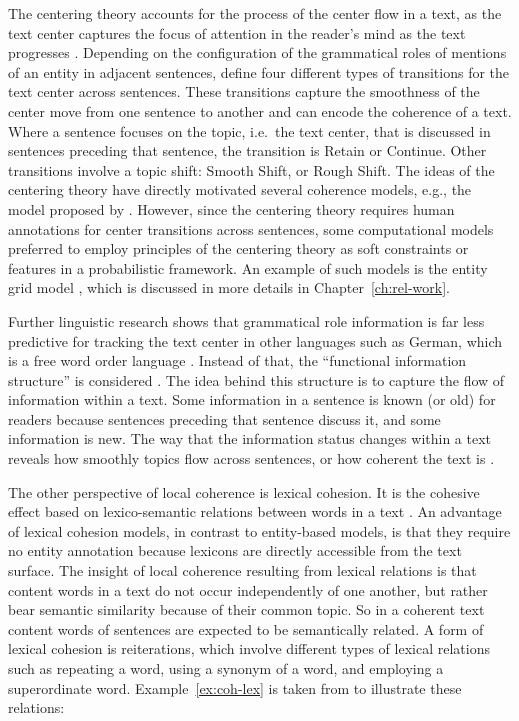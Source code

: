 The centering theory accounts for the process of the center flow in a text, as the text center captures the focus of attention in the reader's mind as the text progresses \cite{grosz95}. 
Depending on the configuration of the grammatical roles of mentions of an entity in adjacent sentences,  define four different types of transitions for the text center across sentences. 
These transitions capture the smoothness of the center move from one sentence to another and can encode the coherence of a text.   
Where a sentence focuses on the topic, i.e.\ the text center, that is discussed in sentences preceding that sentence, the transition is Retain or Continue. 
Other transitions involve a topic shift: Smooth Shift, or Rough Shift. 
The ideas of the centering theory have directly motivated several coherence models, e.g., the model proposed by .  
However, since the centering theory requires human annotations for center transitions across sentences, some computational models preferred to employ principles of the centering theory as soft constraints or features in a probabilistic framework. An example of such models is the entity grid model \cite{barzilay05a,barzilay08}, which is discussed in more details in Chapter~\ref{ch:rel-work}. 

Further linguistic research shows that grammatical role information is far less predictive for tracking the text center in other languages such as German, which is a free word order language \cite{strube.acl96}. 
Instead of that, the ``functional information structure'' \cite{danes74a} is considered \cite{strube.acl96}.  
The idea behind this structure is to capture the flow of information within a text.  
Some information in a sentence is known (or old) for readers because sentences preceding that sentence discuss it, and some information is new. 
The way that the information status changes within a text reveals how smoothly topics flow across sentences, or how coherent the text is \cite{danes74a}.    

The other perspective of local coherence is lexical cohesion. 
It is the cohesive effect based on lexico-semantic relations between words in a text \cite{halliday76}.  
An advantage of lexical cohesion models, in contrast to entity-based models, is that they require no entity annotation because lexicons are directly accessible from the text surface.  
The insight of local coherence resulting from lexical relations is that content words in a text do not occur independently of one another, but rather bear semantic similarity because of their common topic. 
So in a coherent text content words of sentences are expected to be semantically related.  
A form of lexical cohesion is reiterations, which involve different types of lexical relations such as repeating a word, using a synonym of a word, and employing a superordinate word. 
Example~\ref{ex:coh-lex} is taken from  to illustrate these relations:


